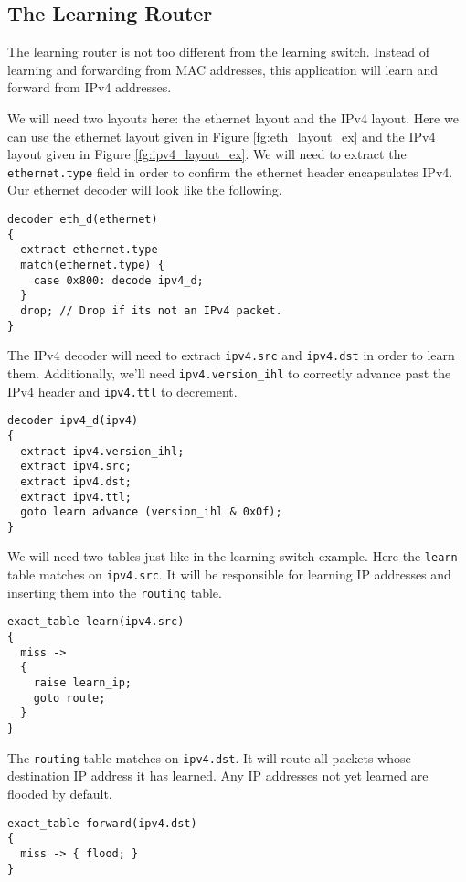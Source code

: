 \subsection{The Learning Router} \label{tut:learning_router}

The learning router is not too different from the learning switch. Instead of learning and forwarding from MAC addresses, this application will learn and forward from IPv4 addresses.

We will need two layouts here: the ethernet layout and the IPv4 layout. Here we can use the ethernet layout given in Figure \ref{fg:eth_layout_ex} and the IPv4 layout given in Figure \ref{fg:ipv4_layout_ex}. We will need to extract the \texttt{ethernet.type} field in order to confirm the ethernet header encapsulates IPv4. Our ethernet decoder will look like the following.
\begin{lstlisting}
decoder eth_d(ethernet)
{
  extract ethernet.type
  match(ethernet.type) {
  	case 0x800: decode ipv4_d;
  }
  drop; // Drop if its not an IPv4 packet.
}
\end{lstlisting}

The IPv4 decoder will need to extract \texttt{ipv4.src} and \texttt{ipv4.dst} in order to learn them. Additionally, we'll need \texttt{ipv4.version\_ihl} to correctly advance past the IPv4 header and \texttt{ipv4.ttl} to decrement.

\begin{lstlisting}
decoder ipv4_d(ipv4)
{
  extract ipv4.version_ihl;
  extract ipv4.src;
  extract ipv4.dst;
  extract ipv4.ttl;
  goto learn advance (version_ihl & 0x0f);
}
\end{lstlisting}

We will need two tables just like in the learning switch example. Here the \texttt{learn} table matches on \texttt{ipv4.src}. It will be responsible for learning IP addresses and inserting them into the \texttt{routing} table.

\begin{lstlisting}
exact_table learn(ipv4.src)
{
  miss ->
  {
	raise learn_ip;
    goto route;
  }
}
\end{lstlisting}

The \texttt{routing} table matches on \texttt{ipv4.dst}. It will route all packets whose destination IP address it has learned. Any IP addresses not yet learned are flooded by default.

\begin{lstlisting}
exact_table forward(ipv4.dst)
{
  miss -> { flood; }
}
\end{lstlisting}

